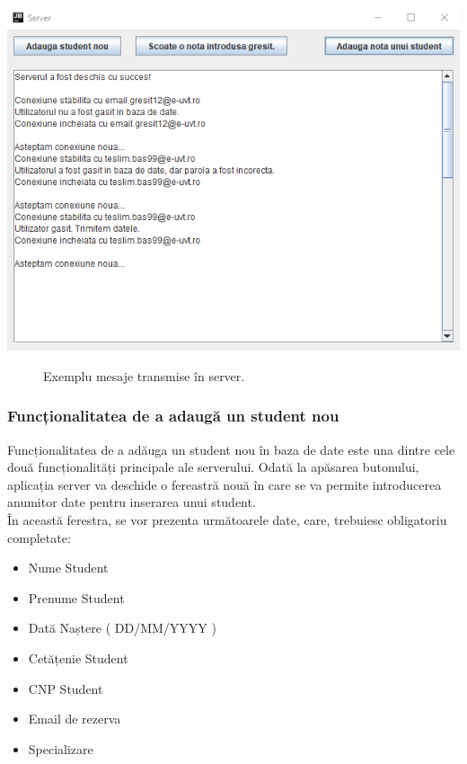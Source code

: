 \documentclass{article}
\begin{document}
	\begin{center}
		\includegraphics[scale=0.7]{Source/ServerOutput}
		\begin{figure}[!h]
			{\caption*{Exemplu mesaje transmise în server.}}
		\end{figure}
	\end{center}
	
	\subsubsection{Funcționalitatea de a adaugă un student nou}\label{Adauga Student}

		Funcționalitatea de a adăuga un student nou în baza de date este una dintre cele două funcționalități principale ale serverului. Odată la apăsarea butonului, aplicația server va deschide o fereastră nouă în care se va permite introducerea anumitor date pentru inserarea unui student. \\

	 	În această ferestra, se vor prezenta următoarele date, care, trebuiesc obligatoriu completate:
	\begin{itemize}
		\item Nume Student
		\item Prenume Student
		\item Dată Naștere ( DD/MM/YYYY )
		\item Cetățenie Student
		\item CNP Student
		\item Email de rezerva
		\item Specializare \\
	\end{itemize}
\end{document}
